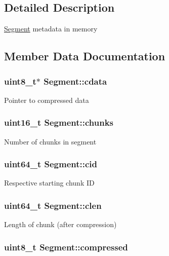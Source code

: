 \subsection{\-Detailed \-Description}
\hyperlink{structSegment}{\-Segment} metadata in memory 

\subsection{\-Member \-Data \-Documentation}
\hypertarget{structSegment_a414dd5e3ff8b23b3b85354a2e070a1db}{
\subsubsection[{cdata}]{\setlength{\rightskip}{0pt plus 5cm}uint8\-\_\-t$\ast$ {\bf \-Segment\-::cdata}}}\label{structSegment_a414dd5e3ff8b23b3b85354a2e070a1db}
\-Pointer to compressed data \hypertarget{structSegment_a1a091314931404d17994b3c0e5e6952c}{
\subsubsection[{chunks}]{\setlength{\rightskip}{0pt plus 5cm}uint16\-\_\-t {\bf \-Segment\-::chunks}}}\label{structSegment_a1a091314931404d17994b3c0e5e6952c}
\-Number of chunks in segment \hypertarget{structSegment_ace61c04c2a87687951bdf781ec0c2a6d}{
\subsubsection[{cid}]{\setlength{\rightskip}{0pt plus 5cm}uint64\-\_\-t {\bf \-Segment\-::cid}}}\label{structSegment_ace61c04c2a87687951bdf781ec0c2a6d}
\-Respective starting chunk \-I\-D \hypertarget{structSegment_a9347d30011ac2acb00e4f023b19a614d}{
\subsubsection[{clen}]{\setlength{\rightskip}{0pt plus 5cm}uint64\-\_\-t {\bf \-Segment\-::clen}}}\label{structSegment_a9347d30011ac2acb00e4f023b19a614d}
\-Length of chunk (after compression) \hypertarget{structSegment_a04120222445f6286ab7ff9441a6283ff}{
\subsubsection[{compressed}]{\setlength{\rightskip}{0pt plus 5cm}uint8\-\_\-t {\bf \-Segment\-::compressed}}}\label{structSegment_a04120222445f6286ab7ff9441a6283ff}

